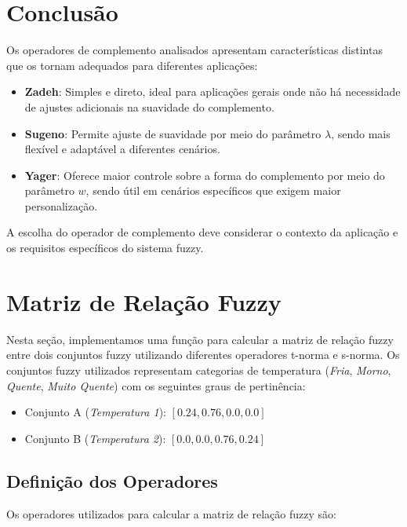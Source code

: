 \documentclass[a4paper,12pt]{article}
\begin{document}
\section{Conclusão}

Os operadores de complemento analisados apresentam características distintas que os tornam adequados para diferentes aplicações:

\begin{itemize}
    \item \textbf{Zadeh}: Simples e direto, ideal para aplicações gerais onde não há necessidade de ajustes adicionais na suavidade do complemento.
    \item \textbf{Sugeno}: Permite ajuste de suavidade por meio do parâmetro $\lambda$, sendo mais flexível e adaptável a diferentes cenários.
    \item \textbf{Yager}: Oferece maior controle sobre a forma do complemento por meio do parâmetro $w$, sendo útil em cenários específicos que exigem maior personalização.
\end{itemize}

A escolha do operador de complemento deve considerar o contexto da aplicação e os requisitos específicos do sistema fuzzy.

\section{Matriz de Relação Fuzzy}

Nesta seção, implementamos uma função para calcular a matriz de relação fuzzy entre dois conjuntos fuzzy utilizando diferentes operadores t-norma e s-norma. Os conjuntos fuzzy utilizados representam categorias de temperatura (\textit{Fria}, \textit{Morno}, \textit{Quente}, \textit{Muito Quente}) com os seguintes graus de pertinência:

\begin{itemize}
    \item Conjunto A (\textit{Temperatura 1}): $[0.24, 0.76, 0.0, 0.0]$
    \item Conjunto B (\textit{Temperatura 2}): $[0.0, 0.0, 0.76, 0.24]$
\end{itemize}

\subsection{Definição dos Operadores}

Os operadores utilizados para calcular a matriz de relação fuzzy são:
\end{document}

